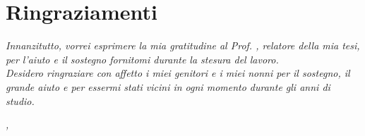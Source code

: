 \cleardoublepage
{}
{}



\bigskip

\begingroup
\let\clearpage\relax
\let\cleardoublepage\relax
\let\cleardoublepage\relax

\chapter*{Ringraziamenti}

\noindent \textit{Innanzitutto, vorrei esprimere la mia gratitudine al Prof. \myProf, relatore della mia tesi, per l'aiuto e il sostegno fornitomi durante la stesura del lavoro.}\\

\noindent \textit{Desidero ringraziare con affetto i miei genitori e i miei nonni per il sostegno, il grande aiuto e per essermi stati vicini in ogni momento durante gli anni di studio.}\\

\bigskip

\noindent\textit{\myLocation, \myTime}
\hfill \myName

\endgroup
